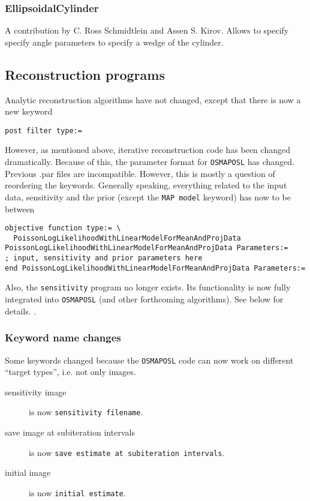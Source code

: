 \documentclass{article}
\begin{document}
\subsubsection{EllipsoidalCylinder}
A contribution by C. Ross Schmidtlein and Assen S. Kirov. Allows
to specify specify angle parameters to specify a wedge of the
cylinder.


\subsection{Reconstruction programs}
\label{sec:Reconstruction_programs}
Analytic reconstruction algorithms have not changed, except that there
is now a new keyword
\begin{verbatim}
post filter type:=
\end{verbatim}
However, as mentioned above, iterative reconstruction code has been 
changed dramatically. Because of this, the parameter format for 
\texttt{OSMAPOSL} has changed.
Previous .par files are incompatible. However, this is mostly a
question of reordering the keywords. Generally speaking, everything
related to the input data, sensitivity and the prior 
(except the \texttt{MAP model} keyword)
has now to be between
\begin{verbatim}
objective function type:= \
  PoissonLogLikelihoodWithLinearModelForMeanAndProjData
PoissonLogLikelihoodWithLinearModelForMeanAndProjData Parameters:=
; input, sensitivity and prior parameters here
end PoissonLogLikelihoodWithLinearModelForMeanAndProjData Parameters:=
\end{verbatim}
Also, the \texttt{sensitivity} program no longer exists. Its functionality
is now fully integrated into \texttt{OSMAPOSL} (and other forthcoming
algorithms). See below for details.
.
\subsubsection{Keyword name changes}
Some keywords changed because the \texttt{OSMAPOSL} code can now work
on different ``target types'', i.e. not only images.
\begin{description}
\item[sensitivity image] is now \texttt{sensitivity filename}.
\item[save image at subiteration intervals] is now
  \texttt{save estimate at subiteration intervals}.
\item[initial image] is now \texttt{initial estimate}.
\end{description}
\end{document}
